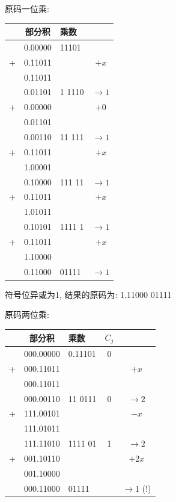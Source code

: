 \documentclass[UTF8]{report}
\newcommand{\ra}{\rightarrow}
\newenvironment{solution}{{\noindent\hskip 2em \bf 解 \quad}}{}
\begin{document}
\begin{solution}
\begin{enumerate}
        原码一位乘:
        \begin{tabular}{cc|l|c}
             & 部分积     & 乘数     & \\
            \hline
             & 0.00000 & 11101   &         \\
            +& 0.11011 &         & $+x$    \\
            \hline
             & 0.11011 &         &         \\
             & 0.01101 & 1 1110  & $\ra 1$ \\
            +& 0.00000 &         & $+0$    \\
            \hline
             & 0.01101 &         &         \\
             & 0.00110 & 11 111 & $\ra 1$ \\
            +& 0.11011 &         & $+x$    \\
            \hline
             & 1.00001 &         &         \\
             & 0.10000 & 111 11  & $\ra 1$ \\
            +& 0.11011 &         & $+x$    \\
            \hline
             & 1.01011 &         &         \\
             & 0.10101 & 1111 1  & $\ra 1$ \\
            +& 0.11011 &         & $+x$    \\
            \hline
             & 1.10000 &         &         \\
             & 0.11000 & 01111   & $\ra 1$ \\
        \end{tabular}
        
        符号位异或为1, 结果的原码为: 1.11000 01111
        
        原码两位乘:
        \begin{tabular}{cc|l|c|c}
             & 部分积      & 乘数      & $C_j$ & \\
            \hline
             & 000.00000 & 0.11101   & 0 & \\
            +& 000.11011 &           &   & $+x $ \\
            \hline
             & 000.11011 &           &   & \\
             & 000.00110 & 11 0111   & 0 & $\ra 2$ \\
            +& 111.00101 &           &   & $-x $ \\
            \hline
             & 111.01011 &           &   & \\
             & 111.11010 & 1111 01   & 1 & $\ra 2$ \\
            +& 001.10110 &           &   & $+2x $ \\
            \hline
             & 001.10000 &           &   & \\
             & 000.11000 & 01111     &  & $\ra 1$ (!) \\
        \end{tabular}


\end{enumerate}
\end{solution}
\end{document}
